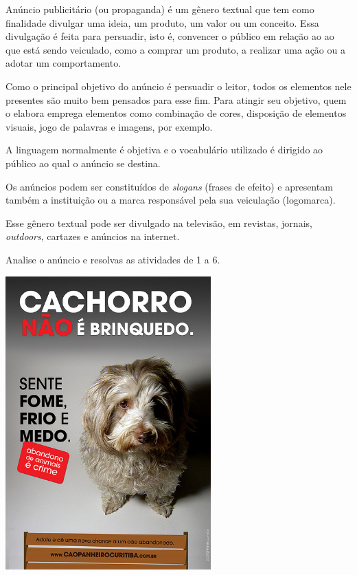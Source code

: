 \begin{boxlist}
{Anúncio publicitário (ou propaganda) é um gênero textual que
tem como finalidade divulgar uma ideia, um produto, um valor ou um
conceito. Essa divulgação é feita para persuadir, isto é, convencer o
público em relação ao ao que está sendo veiculado, como a comprar um
produto, a realizar uma ação ou a adotar um comportamento.

Como o principal objetivo do anúncio é persuadir o leitor,
todos os elementos nele presentes são muito bem pensados para esse fim. Para atingir
seu objetivo, quem o elabora emprega elementos como
combinação de cores, disposição de elementos visuais, jogo de palavras e
imagens, por exemplo.

A linguagem normalmente é objetiva e o vocabulário utilizado é dirigido
ao público ao qual o anúncio se destina.

Os anúncios podem ser constituídos de \emph{slogans} (frases de efeito)
e apresentam também a instituição ou a marca responsável pela sua
veiculação (logomarca).

Esse gênero textual pode ser divulgado na televisão, em revistas,
jornais, \emph{outdoors}, cartazes e anúncios na internet.


Analise o anúncio e resolvas as atividades de 1 a 6.



\includegraphics[width=3.11354in,height=4.44792in]{media/image9.jpeg}

}
\end{boxlist}
